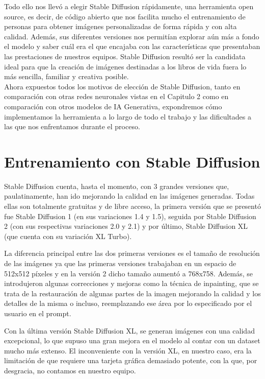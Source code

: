 Todo ello nos llevó a elegir Stable Diffusion rápidamente, una herramienta open source, es decir, de código abierto que nos facilita mucho el entrenamiento de personas para obtener imágenes personalizadas de forma rápida y con alta calidad. Además, sus diferentes versiones nos permitían explorar aún más a fondo el modelo y saber cuál era el que encajaba con las características que presentaban las prestaciones de nuestros equipos. Stable Diffusion resultó ser la candidata ideal para que la creación de imágenes destinadas a  los libros de vida fuera lo más sencilla, familiar y creativa posible. \\

Ahora expuestos todos los motivos de elección de Stable Diffusion, tanto en comparación con otras redes neuronales vistas en el Capitulo 2 como en comparación con otros modelos de IA Generativa, expondremos cómo implementamos la herramienta a lo largo de todo el trabajo y las dificultades a las que nos enfrentamos durante el proceso. \\

\section{Entrenamiento con Stable Diffusion}

Stable Diffusion cuenta, hasta el momento, con 3 grandes versiones que, paulatinamente, han ido mejorando la calidad en las imágenes generadas. Todas ellas son totalmente gratuitas y de libre acceso, la primera versión que se presentó fue Stable Diffusion 1 (en sus variaciones 1.4 y 1.5), seguida por Stable Diffusion 2 (con sus respectivas variaciones 2.0 y 2.1) y por último, Stable Diffusion XL (que cuenta con su variación XL Turbo). 

La diferencia principal entre las dos primeras versiones es el tamaño de resolución de las imágenes ya que las primeras versiones trabajaban en un espacio de 512x512 píxeles y en la versión 2 dicho tamaño aumentó a 768x758. Además, se introdujeron algunas correcciones y mejoras como la técnica de inpainting, que se trata de la restauración de algunas partes de la imagen mejorando la calidad y los detalles de la misma o incluso, reemplazando ese área por lo especificado por el usuario en el prompt.

Con la última versión Stable Diffusion XL, se generan imágenes con una calidad excepcional, lo que supuso una gran mejora en el modelo al contar con un dataset mucho más extenso. El inconveniente con la versión XL, en nuestro caso, era la limitación de que requiere una tarjeta gráfica demasiado potente, con la que, por desgracia, no contamos en nuestro equipo. 

